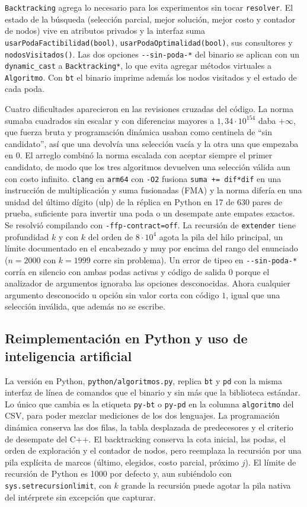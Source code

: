 \texttt{Backtracking} agrega lo necesario para los experimentos sin tocar \texttt{resolver}. El estado de la búsqueda (selección parcial, mejor solución, mejor costo y contador de nodos) vive en atributos privados y la interfaz suma \texttt{usarPodaFactibilidad(bool)}, \texttt{usarPodaOptimalidad(bool)}, sus consultores y \texttt{nodosVisitados()}. Las dos opciones \texttt{-{}-sin-poda-*} del binario se aplican con un \texttt{dynamic\_cast} a \texttt{Backtracking*}, lo que evita agregar métodos virtuales a \texttt{Algoritmo}. Con \texttt{bt} el binario imprime además los nodos visitados y el estado de cada poda.

Cuatro dificultades aparecieron en las revisiones cruzadas del código. La norma sumaba cuadrados sin escalar y con diferencias mayores a $1{,}34 \cdot 10^{154}$ daba $+\infty$, que fuerza bruta y programación dinámica usaban como centinela de ``sin candidato'', así que una devolvía una selección vacía y la otra una que empezaba en $0$. El arreglo combinó la norma escalada con aceptar siempre el primer candidato, de modo que los tres algoritmos devuelven una selección válida aun con costo infinito. \texttt{clang} en \texttt{arm64} con \texttt{-O2} fusiona \texttt{suma += dif*dif} en una instrucción de multiplicación y suma fusionadas (FMA) y la norma difería en una unidad del último dígito (ulp) de la réplica en Python en 17 de 630 pares de prueba, suficiente para invertir una poda o un desempate ante empates exactos. Se resolvió compilando con \texttt{-ffp-contract=off}. La recursión de \texttt{extender} tiene profundidad $k$ y con $k$ del orden de $8 \cdot 10^{4}$ agota la pila del hilo principal, un límite documentado en el encabezado y muy por encima del rango del enunciado ($n = 2000$ con $k = 1999$ corre sin problema). Un error de tipeo en \texttt{-{}-sin-poda-*} corría en silencio con ambas podas activas y código de salida $0$ porque el analizador de argumentos ignoraba las opciones desconocidas. Ahora cualquier argumento desconocido u opción sin valor corta con código $1$, igual que una selección inválida, que además no se escribe.

\subsection{Reimplementación en Python y uso de inteligencia artificial}\label{sec:python}

La versión en Python, \texttt{python/algoritmos.py}, replica \texttt{bt} y \texttt{pd} con la misma interfaz de línea de comandos que el binario y sin más que la biblioteca estándar. Lo único que cambia es la etiqueta \texttt{py-bt} o \texttt{py-pd} en la columna \texttt{algoritmo} del CSV, para poder mezclar mediciones de los dos lenguajes. La programación dinámica conserva las dos filas, la tabla desplazada de predecesores y el criterio de desempate del C++. El backtracking conserva la cota inicial, las podas, el orden de exploración y el contador de nodos, pero reemplaza la recursión por una pila explícita de marcos (último, elegidos, costo parcial, próximo $j$). El límite de recursión de Python es 1000 por defecto y, aun subiéndolo con \texttt{sys.setrecursionlimit}, con $k$ grande la recursión puede agotar la pila nativa del intérprete sin excepción que capturar.

